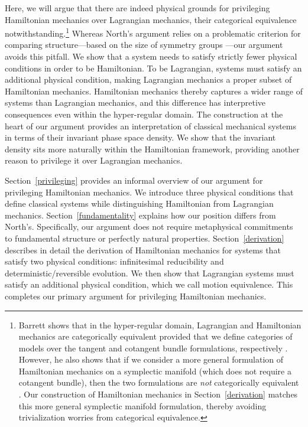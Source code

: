\documentclass[letterpaper]{article}
\begin{document}
Here, we will argue that there are indeed physical grounds for privileging Hamiltonian mechanics over Lagrangian mechanics, their categorical equivalence notwithstanding.\footnote{Barrett shows that in the hyper-regular domain, Lagrangian and Hamiltonian mechanics are categorically equivalent provided that we define categories of models over the tangent and cotangent bundle formulations, respectively \parencites*[1181-82]{Barrett2}. However, he also shows that if we consider a more general formulation of Hamiltonian mechanics on a symplectic manifold (which does not require a cotangent bundle), then the two formulations are \textit{not} categorically equivalent \parencites*[1182-83]{Barrett2}. Our construction of Hamiltonian mechanics in Section~\ref{derivation} matches this more general symplectic manifold formulation, thereby avoiding trivialization worries from categorical equivalence.} Whereas North's argument relies on a problematic criterion for comparing structure---based on the size of symmetry groups \parencites[]{Swanson}---our argument avoids this pitfall. We show that a system needs to satisfy strictly fewer physical conditions in order to be Hamiltonian. To be Lagrangian, systems must satisfy an additional physical condition, making Lagrangian mechanics a proper subset of Hamiltonian mechanics. Hamiltonian mechanics thereby captures a wider range of systems than Lagrangian mechanics, and this difference has interpretive consequences even within the hyper-regular domain. The construction at the heart of our argument provides an interpretation of classical mechanical systems in terms of their invariant phase space density. We show that the invariant density sits more naturally within the Hamiltonian framework, providing another reason to privilege it over Lagrangian mechanics.

Section~\ref{privileging} provides an informal overview of our argument for privileging Hamiltonian mechanics. We introduce three physical conditions that define classical systems while distinguishing Hamiltonian from Lagrangian mechanics. Section~\ref{fundamentality} explains how our position differs from North's. Specifically, our argument does not require metaphysical commitments to fundamental structure or perfectly natural properties. Section~\ref{derivation} describes in detail the derivation of Hamiltonian mechanics for systems that satisfy two physical conditions: infinitesimal reducibility and deterministic/reversible evolution. We then show that Lagrangian systems must satisfy an additional physical condition, which we call motion equivalence. This completes our primary argument for privileging Hamiltonian mechanics.
\end{document}
